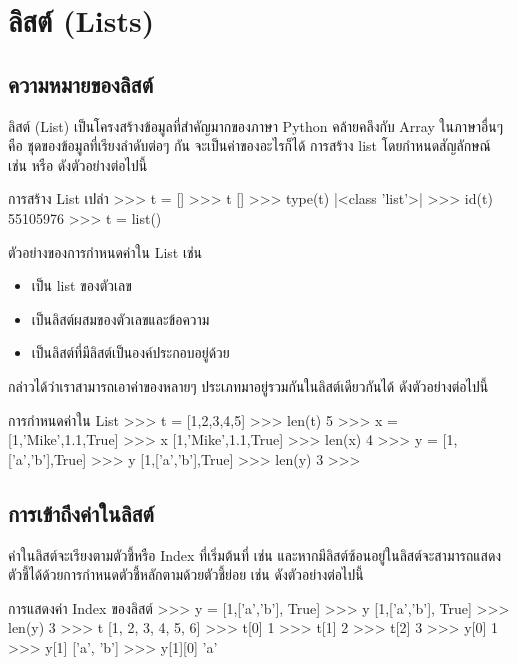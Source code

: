 \chapter{ลิสต์ (Lists)}
\section{ความหมายของลิสต์}

ลิสต์ (List) เป็นโครงสร้างข้อมูลที่สำคัญมากของภาษา Python คล้ายคลึงกับ Array ในภาษาอื่นๆ คือ ชุดของข้อมูลที่เรียงลำดับต่อๆ กัน จะเป็นค่าของอะไรก็ได้ การสร้าง list โดยกำหนดสัญลักษณ์  \pyinline{[]} เช่น   หรือ   ดังตัวอย่างต่อไปนี้

\begin{codelist}{การสร้าง List เปล่า}{}
>>> t = []
>>> t
[]
>>> type(t)
|<class \rq{}list\rq{}>|
>>> id(t)
55105976
>>> t = list()
\end{codelist}


ตัวอย่างของการกำหนดค่าใน List เช่น 

\begin{itemize}
\item {} เป็น list ของตัวเลข 
\item {} เป็นลิสต์ผสมของตัวเลขและข้อความ
\item {} เป็นลิสต์ที่มีลิสต์เป็นองค์ประกอบอยู่ด้วย
\end{itemize}
กล่าวได้ว่าเราสามารถเอาค่าของหลายๆ ประเภทมาอยู่รวมกันในลิสต์เดียวกันได้ ดังตัวอย่างต่อไปนี้

\begin{codelist}{การกำหนดค่าใน List}{}
>>> t = [1,2,3,4,5]
>>> len(t)
5
>>> x = [1,'Mike',1.1,True]
>>> x
[1,'Mike',1.1,True]
>>> len(x)
4
>>> y = [1,['a','b'],True]
>>> y
[1,['a','b'],True]
>>> len(y)
3
>>>
\end{codelist}


\section{การเข้าถึงค่าในลิสต์}

ค่าในลิสต์จะเรียงตามตัวชี้หรือ Index ที่เริ่มต้นที่   เช่น  และหากมีลิสต์ซ้อนอยู่ในลิสต์จะสามารถแสดงตัวชี้ได้ด้วยการกำหนดตัวชี้หลักตามด้วยตัวชี้ย่อย เช่น  ดังตัวอย่างต่อไปนี้

\begin{codelist}{การแสดงค่า Index ของลิสต์}{}
>>> y = [1,['a','b'], True]
>>> y
[1,['a','b'], True]
>>> len(y)
3
>>> t
[1, 2, 3, 4, 5, 6]
>>> t[0]
1
>>> t[1]
2
>>> t[2]
3
>>> y[0]
1
>>> y[1]
['a', 'b']
>>> y[1][0]
'a'
\end{codelist}


